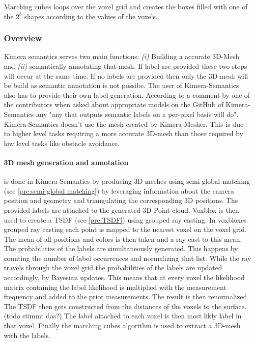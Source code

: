 \documentclass[11pt,a4paper]{article}
\begin{document}
Marching cubes loops over the voxel grid and creates the boxes filled with one of the $2^8$ shapes according to the values of the voxels.

\subsubsection{Overview}
Kimera semantics serves two main functions: \textit{(i)} Building a accurate 3D-Mesh and  \textit{(ii)} semantically annotating that mesh.
If label are provided these two steps will occur at the same time.  
If no labels are provided then only the 3D-mesh will be build as semantic annotation is not possibe.
The user of Kimera-Semantics also has to provide their own label generation. 
According to a comment by one of the contributors when asked about appropriate models on the GitHub of Kimera-Semantics any "any that outputs semantic labels on a per-pixel basis will do".
Kimera-Semantics doesn't use the mesh created by Kimera-Mesher. 
This is due to higher level tasks requiring a more accurate 3D-mesh than those required by low level tasks like obstacle avoidance.
\paragraph{3D mesh generation and annotation}
is done in Kimera Semantics by producing 3D meshes using semi-global matching (see \ref{pre:semi-global matching}) by leveraging information about the camera position and geometry and triangulating the corresponding 3D positions.
The provided labels are attached to the generated 3D-Point cloud. 
Voxblox is then used to create a TSDF (see \ref{pre:TSDF}) using grouped ray casting.
In voxbloxes grouped ray casting each point is mapped to the nearest voxel on the voxel grid. 
The mean of all positions and colors is then taken and a ray cast to this mean. 
The probabilities of the labels are simultaneously generated. 
This happens by counting the number of label occurrences and normalizing that list. 
While the ray travels through the voxel grid the probabilities of the labels are updated accordingly, by Bayesian updates. 
This means that at every voxel the likelihood matrix containing the label likelihood is multiplied with the measurement frequency and added to the prior measurements. 
The result is then renormalized. 
The TSDF then gets constructed from the distances of the voxels to the surface. (todo stimmt das?)
The label attached to each voxel is then most likly label in that voxel.
Finally the marching cubes algorithm is used to extract a 3D-mesh with the labels.
\end{document}
